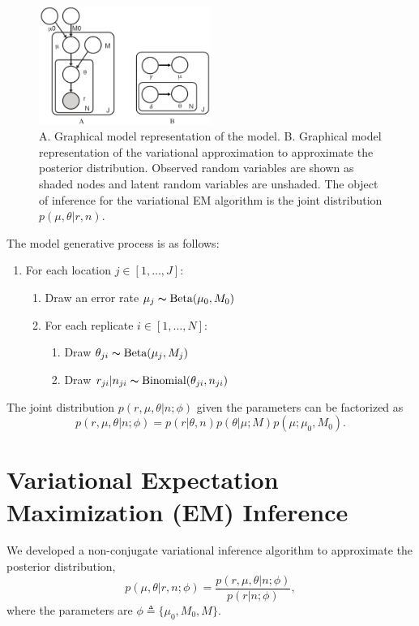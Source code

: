 \documentclass[11pt,reqno]{amsart}
\begin{document}
\begin{figure}[htpb]
\centering
\includegraphics[width=0.5\textwidth]{figs/rvd3_model.png}
\caption{A. Graphical model representation of the model.
B. Graphical model representation of the variational approximation  to approximate the posterior distribution.
Observed random variables are shown as shaded nodes and latent random variables are unshaded.
The object of inference for the variational EM algorithm is the joint distribution $p(\mu, \theta|r, n)$.}
\label{tbl:graphical_model}
\end{figure}
The model generative process is as follows:
\begin{enumerate}[noitemsep]
    \item For each location $j \in [1, \ldots, J]$:
	\begin{enumerate}
		\item Draw an error rate $\mu_j \thicksim \text{Beta}(\mu_0, M_0)$
		\item For each replicate $i \in [1, \ldots, N]$:
		\begin{enumerate}
			\item Draw $\theta_{ji} \thicksim \text{Beta}(\mu_j, M_j)$
			\item Draw $r_{ji} | n_{ji} \thicksim \text{Binomial}(\theta_{ji}, n_{ji})$
		\end{enumerate}
	\end{enumerate}
\end{enumerate}

The joint distribution $p(r, \mu, \theta|n; \phi)$ given the parameters can be factorized as
\begin{equation}
    p(r, \mu, \theta| n; \phi) = p(r |\theta, n)p(\theta |\mu; M )p(\mu;\mu_0, M_0).
\end{equation}

\section{Variational Expectation Maximization (EM) Inference}
We developed a non-conjugate variational inference algorithm to approximate the posterior distribution,
\begin{equation}
	p(\mu, \theta | r, n; \phi)  = \frac{ p(r, \mu, \theta| n; \phi) } {p ( r | n; \phi)},
\end{equation}
where the parameters are $\phi \triangleq \{\mu_0, M_0, M\}$.
\end{document}
